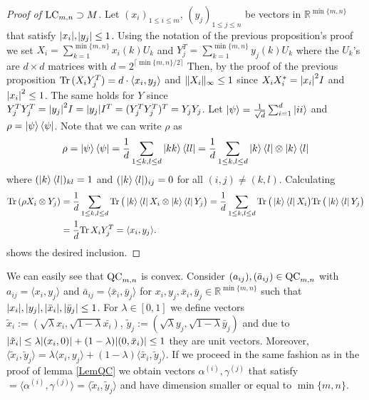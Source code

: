 \begin{proof}[Proof of $ \textup{LC}_{m,n} \supset M $]
Let $ (x_i)_{1 \le i \le m}, \, (y_j)_{1 \le j \le n} $ be vectors in $\mathbb{R}^{\min \{ m,n \}}$ that satisfy 
$ {\left|{x_i}\right|},$$ {\left|{y_j}\right|} \le 1 $. 
Using the notation of the previous proposition's proof we set $ X_i = \sum_{k=1}^{\min \{m,n\}} x_i(k)U_k $ and $ Y_j^{T } = \sum_{k=1}^{\min \{m,n\}}y_j(k)U_k $ where the $ U_k $'s are $ d \times d $ matrices with $  d = 2^{\lceil \min \{m,n\}/2 \rceil} $
Then, by the proof of the previous proposition $ \text{Tr} \, {(X_iY_j^T)}  = d\cdot \langle x_i, y_j \rangle  $ and $  \Vert {X_i} \Vert_{\infty} \le 1 $ since $ X_iX_i^* = {\left|{x_i}\right|}^2I $ and $ {\left|{x_i}\right|}^2 \le 1  $. The same holds for $ Y $ since $ Y_j^TY_j^T =   {\left|{y_j}\right|}^2I = {\left|{y_j}\right|}I^T = (Y_j^TY_j^T)^T = Y_jY_j  $.
Let $ \ket{\psi} = \frac{1}{\sqrt{d}}\sum_{i= 1}^{d}\ket{ii} $ and $ \rho = \ket{\psi}\bra{\psi} $. Note that we can write $ \rho $ as
\begin{align*}
\rho = \ket{\psi}\bra{\psi} = \frac{1}{d}\sum_{1 \le k,l \le d}\ket{kk}\bra{ll} = \frac{1}{d} \sum_{1 \le k,l \le d}\ket{k}\bra{l} \otimes \ket{k}\bra{l}
\end{align*}
where $  (\ket{k}\bra{l})_{kl} = 1 $ and $ (\ket{k}\bra{l})_{ij} = 0 $ for all $ (i,j)\neq (k,l) $.
Calculating
\begin{align*}
\text{Tr} \, {(\rho X_i \otimes Y_j)}  &=\frac{1}{d} \sum_{1 \le k,l \le d} \text{Tr} \, { \big (\ket{k}\bra{l}X_i \otimes \ket{k}\bra{l}Y_j \big )}  = \frac{1}{d} \sum_{1 \le k,l \le d} \text{Tr} \, {\big (\ket{k}\bra{l}X_i \big )}  \text{Tr} \, {\big (\ket{k}\bra{l}Y_j \big )}  \\
&=  \frac{1}{d} \text{Tr} \, {X_iY_j^T}  = \langle x_i,y_j \rangle.
\end{align*}
shows the desired inclusion. 
\end{proof}
\noindent We can easily see that $ \textup{QC}_{m,n} $ is convex. Consider $ (a_{ij}), (\bar{a}_{ij}) \in \textup{QC}_{m,n} $ with $ a_{ij} = \langle x_i, y_j \rangle $ and $ \bar{a}_{ij} = \langle \bar{x}_i, \bar{y}_j \rangle $ for $ x_{i},y_j, \bar{x}_i,\bar{y}_j \in \mathbb{R}^{\min \{m,n\}} $ such that $ {\left|{x_i}\right|},{\left|{y_j}\right|}, {\left|{\bar{x}_i}\right|}, {\left|{\bar{y}_j}\right|} \le 1 $.
For $ \lambda \in [0,1] $ we define vectors $\tilde{x}_i:= (\sqrt{\lambda}x_i,\sqrt{1-\lambda}\bar{x_i}), \, \tilde{y}_j:= (\sqrt{\lambda}y_j, \sqrt{1-\lambda}\bar{y}_j) $ and due to  $ {\left|{\tilde{x}_i}\right|} \le \lambda {\left|{(x_i,0)}\right|} + (1-\lambda){\left|{(0,\bar{x}_i)}\right|} \le 1 $ they are unit vectors. Moreover, $ \langle \tilde{x}_i, \tilde{y}_j \rangle = \lambda \langle x_i,y_j \rangle + (1-\lambda) \langle \tilde{x_i},\tilde{y}_j \rangle$. If we proceed in the same fashion as in the proof of lemma \ref{LemQC} we obtain vectors 
$ \alpha^{(i)},\gamma^{(j)} $ that satisfy $= \langle \alpha^{(i)},\gamma^{(j)} \rangle = \langle \tilde{x} _i, \tilde{y}_j\rangle $ and have dimension smaller or equal to $ \min \{m,n\} $.


